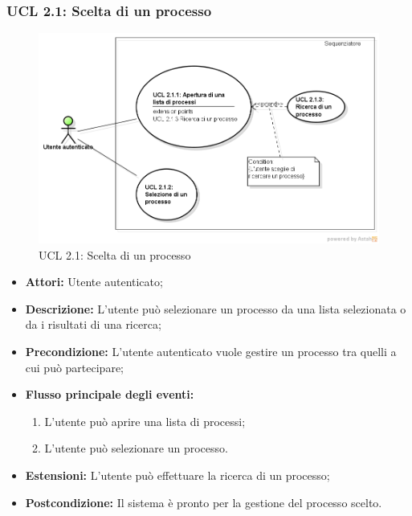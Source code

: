 \subsubsection{UCL 2.1: Scelta di un processo}
\begin{figure}[H]
\centering
\includegraphics[trim=0cm 0.8cm 0cm 0cm,clip=true,width=%
\textwidth]
{./grafici/L21}
\caption{UCL 2.1: Scelta di un processo}
\end{figure}
\begin{itemize}
\item \textbf{Attori:} Utente autenticato;
\item \textbf{Descrizione:} L'utente può selezionare un processo da una lista selezionata o da i risultati di una ricerca;
\item \textbf{Precondizione:} L'utente autenticato vuole gestire un processo tra quelli a cui può partecipare;
\item \textbf{Flusso principale degli eventi:}
\begin{enumerate}
\item L'utente può aprire una lista di processi;
\item L'utente può selezionare un processo.
\end{enumerate}
\item \textbf{Estensioni:} L'utente può effettuare la ricerca di un processo;
\item \textbf{Postcondizione:} Il sistema è pronto per la gestione del processo scelto.
\end{itemize}

\hypertarget{L2.1.1}{}
